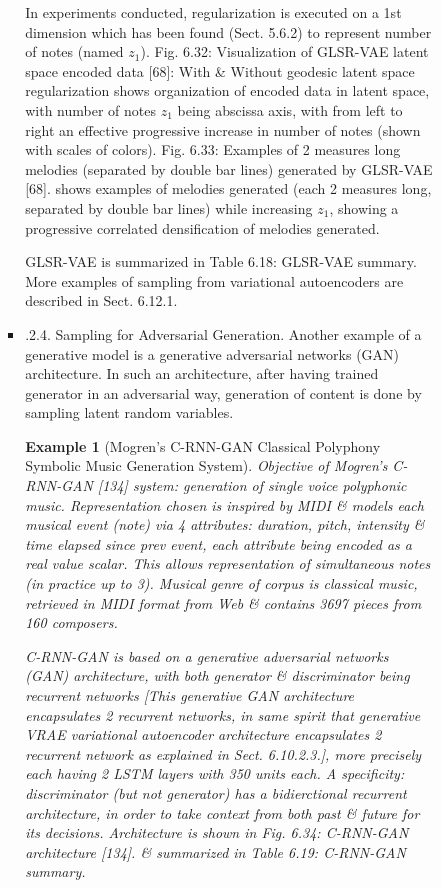 \documentclass{article}
\newtheorem{example}{Example}
\begin{document}
\begin{itemize}
\begin{itemize}
\begin{itemize}
\begin{itemize}
				In experiments conducted, regularization is executed on a 1st dimension which has been found (Sect. 5.6.2) to represent number of notes (named $z_1$). {\sf Fig. 6.32: Visualization of GLSR-VAE latent space encoded data [68]: With \& Without geodesic latent space regularization} shows organization of encoded data in latent space, with number of notes $z_1$ being abscissa axis, with from left to right an effective progressive increase in number of notes (shown with scales of colors). {\sf Fig. 6.33: Examples of 2 measures long melodies (separated by double bar lines) generated by GLSR-VAE [68].} shows examples of melodies generated (each 2 measures long, separated by double bar lines) while increasing $z_1$, showing a progressive correlated densification of melodies generated.
				
				GLSR-VAE is summarized in {\sf Table 6.18: GLSR-VAE summary}. More examples of sampling from variational autoencoders are described in Sect. 6.12.1.
				\item {.2.4. Sampling for Adversarial Generation.} Another example of a generative model is a generative adversarial networks (GAN) architecture. In such an architecture, after having trained generator in an adversarial way, generation of content is done by sampling latent random variables.
				\begin{example}[Mogren's C-RNN-GAN Classical Polyphony Symbolic Music Generation System]
					Objective of Mogren's C-RNN-GAN [134] system: generation of single voice polyphonic music. Representation chosen is inspired by MIDI \& models each musical event (note) via 4 attributes: duration, pitch, intensity \& time elapsed since prev event, each attribute being encoded as a real value scalar. This allows representation of simultaneous notes (in practice up to 3). Musical genre of corpus is classical music, retrieved in MIDI format from Web \& contains 3697 pieces from 160 composers.
					
					C-RNN-GAN is based on a generative adversarial networks (GAN) architecture, with both generator \& discriminator being recurrent networks [This generative GAN architecture encapsulates 2 recurrent networks, in same spirit that generative VRAE variational autoencoder architecture encapsulates 2 recurrent network as explained in Sect. 6.10.2.3.], more precisely each having 2 LSTM layers with 350 units each. A specificity: discriminator (but not generator) has a bidierctional recurrent architecture, in order to take context from both past \& future for its decisions. Architecture is shown in {\sf Fig. 6.34: C-RNN-GAN architecture [134].} \& summarized in {\sf Table 6.19: C-RNN-GAN summary}.
					

\end{example}
\end{itemize}
\end{itemize}
\end{itemize}
\end{itemize}
\end{document}
